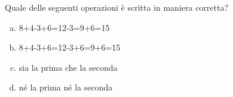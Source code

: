 \item Quale delle seguenti operazioni è scritta in maniera corretta?
\begin{enumerate}[(a)]
\item 8+4-3+6=12-3=9+6=15
\item 8+4-3+6=12-3+6=9+6=15
\item sia la prima che la seconda
\item né la prima né la seconda
\end{enumerate}

